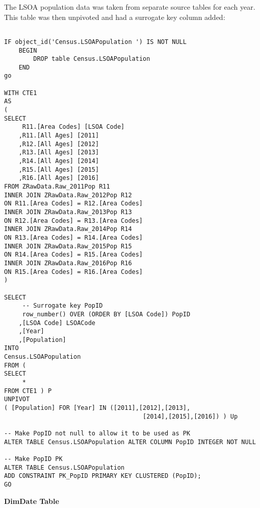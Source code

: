 \documentclass{article}
\begin{document}
The LSOA population data was taken from separate source tables for each year. This table was then unpivoted and had a surrogate key column added:
\begin{lstlisting}

IF object_id('Census.LSOAPopulation ') IS NOT NULL 
	BEGIN 
		DROP table Census.LSOAPopulation
	END
go

WITH CTE1 
AS
(
SELECT
	 R11.[Area Codes] [LSOA Code]
	,R11.[All Ages] [2011]
	,R12.[All Ages] [2012]
	,R13.[All Ages] [2013]
	,R14.[All Ages] [2014]
	,R15.[All Ages] [2015]
	,R16.[All Ages] [2016]
FROM ZRawData.Raw_2011Pop R11
INNER JOIN ZRawData.Raw_2012Pop R12
ON R11.[Area Codes] = R12.[Area Codes]
INNER JOIN ZRawData.Raw_2013Pop R13
ON R12.[Area Codes] = R13.[Area Codes]
INNER JOIN ZRawData.Raw_2014Pop R14
ON R13.[Area Codes] = R14.[Area Codes]
INNER JOIN ZRawData.Raw_2015Pop R15
ON R14.[Area Codes] = R15.[Area Codes]
INNER JOIN ZRawData.Raw_2016Pop R16
ON R15.[Area Codes] = R16.[Area Codes]
)

SELECT 
	 -- Surrogate key PopID
	 row_number() OVER (ORDER BY [LSOA Code]) PopID
	,[LSOA Code] LSOACode
	,[Year]
	,[Population]
INTO 
Census.LSOAPopulation 
FROM ( 
SELECT 
	 * 
FROM CTE1 ) P 
UNPIVOT 
( [Population] FOR [Year] IN ([2011],[2012],[2013],
									  [2014],[2015],[2016]) ) Up

-- Make PopID not null to allow it to be used as PK
ALTER TABLE Census.LSOAPopulation ALTER COLUMN PopID INTEGER NOT NULL

-- Make PopID PK
ALTER TABLE Census.LSOAPopulation   
ADD CONSTRAINT PK_PopID PRIMARY KEY CLUSTERED (PopID);  
GO 

\end{lstlisting}
\bigskip

\noindent
\textbf{DimDate Table}
\end{document}
